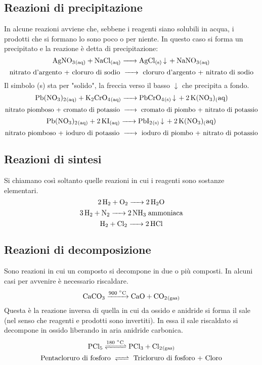 \subsection{Reazioni di precipitazione}
In alcune reazioni avviene che, sebbene i reagenti siano solubili in acqua, i prodotti che si formano lo sono poco o per niente. In questo caso si forma un precipitato e la reazione è detta di precipitazione:
$$\ce{ AgNO_3_{(aq)} + NaCl_{(aq)} -> AgCl_{(s)} v  + NaNO_3_{(aq)} }$$
$$\text{nitrato d'argento + cloruro di sodio \ce{->} cloruro d'argento + nitrato di sodio}$$
Il simbolo (s) sta per "solido", la freccia verso il basso $\downarrow$ che precipita a fondo.
$$\ce{Pb(NO_3)_2_{(aq)} + K_2CrO_4_{(aq)} ->  PbCrO_4_{(s)} v + 2 K(NO_3){_(aq)}}$$
$$\text{nitrato piomboso + cromato di potassio \ce{->} cromato di piombo + nitrato di potassio}$$
$$\ce{Pb(NO_3)_2_{(aq)} + 2 KI_{(aq)} ->  PbI_2_{(s)} v + 2 K(NO_3){_(aq)}}$$
$$\text{nitrato piomboso + ioduro di potassio \ce{->} ioduro di piombo + nitrato di potassio}$$
\subsection{Reazioni di sintesi}
Si chiamano così soltanto quelle reazioni in cui i reagenti sono sostanze elementari.
$$\ce{2 H_2 + O_2 -> 2 H_2O}$$
$$\ce{3 H_2 + N_2 -> 2 NH_3} \; \text{ammoniaca}$$
$$\ce{H_2 + Cl_2 -> 2 HCl}$$
\subsection{Reazioni di decomposizione}
Sono reazioni in cui un composto si decompone in due o più composti. In alcuni casi per avvenire è necessario riscaldare.
$$\ce{CaCO_3 ->[{900 ^{\circ}C}] CaO + CO_2_{(gas)} }$$
Questa è la reazione inversa di quella in cui da ossido e anidride si forma il sale (nel senso che reagenti e prodotti sono invertiti). In essa il sale riscaldato si decompone in ossido liberando in aria anidride carbonica.
$$\ce{PCl_5 <=>[{180 ^{\circ}C}] PCl_3 + Cl_2_{(gas)}}$$
$$\text{Pentacloruro di fosforo \ce{<=>} Tricloruro di fosforo + Cloro}$$